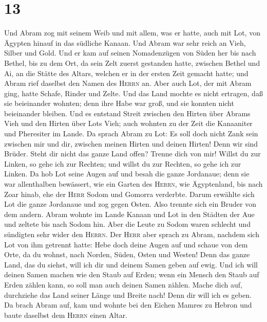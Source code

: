 \hypertarget{section-12}{%
\section{13}\label{section-12}}

 Und Abram zog mit seinem Weib und mit allem, was er
hatte, auch mit Lot, von Ägypten hinauf in das südliche Kanaan.
 Und Abram war sehr reich an Vieh, Silber und Gold.
 Und er kam auf seinen Nomadenzügen von Süden her bis nach
Bethel, bis zu dem Ort, da sein Zelt zuerst gestanden hatte, zwischen
Bethel und Ai,  an die Stätte des Altars, welchen er in
der ersten Zeit gemacht hatte; und Abram rief daselbst den Namen des
\textsc{Herrn} an.  Aber auch Lot, der mit Abram ging,
hatte Schafe, Rinder und Zelte.  Und das Land mochte es
nicht ertragen, daß sie beieinander wohnten; denn ihre Habe war groß,
und sie konnten nicht beieinander bleiben.  Und es
entstand Streit zwischen den Hirten über Abrams Vieh und den Hirten über
Lots Vieh; auch wohnten zu der Zeit die Kanaaniter und Pheresiter im
Lande.  Da sprach Abram zu Lot: Es soll doch nicht Zank
sein zwischen mir und dir, zwischen meinen Hirten und deinen Hirten!
Denn wir sind Brüder.  Steht dir nicht das ganze Land
offen? Trenne dich von mir! Willst du zur Linken, so gehe ich zur
Rechten; und willst du zur Rechten, so gehe ich zur Linken.
 Da hob Lot seine Augen auf und besah die ganze
Jordanaue; denn sie war allenthalben bewässert, wie ein Garten des
\textsc{Herrn}, wie Ägyptenland, bis nach Zoar hinab, ehe der
\textsc{Herr} Sodom und Gomorra verderbte.  Darum
erwählte sich Lot die ganze Jordanaue und zog gegen Osten. Also trennte
sich ein Bruder von dem andern.  Abram wohnte im Lande
Kanaan und Lot in den Städten der Aue und zeltete bis nach Sodom hin.
 Aber die Leute zu Sodom waren schlecht und sündigten
sehr wider den \textsc{Herrn}.  Der \textsc{Herr} aber
sprach zu Abram, nachdem sich Lot von ihm getrennt hatte: Hebe doch
deine Augen auf und schaue von dem Orte, da du wohnst, nach Norden,
Süden, Osten und Westen!  Denn das ganze Land, das du
siehst, will ich dir und deinem Samen geben auf ewig. 
Und ich will deinen Samen machen wie den Staub auf Erden; wenn ein
Mensch den Staub auf Erden zählen kann, so soll man auch deinen Samen
zählen.  Mache dich auf, durchziehe das Land seiner Länge
und Breite nach! Denn dir will ich es geben.  Da brach
Abram auf, kam und wohnte bei den Eichen Mamres zu Hebron und baute
daselbst dem \textsc{Herrn} einen Altar.

